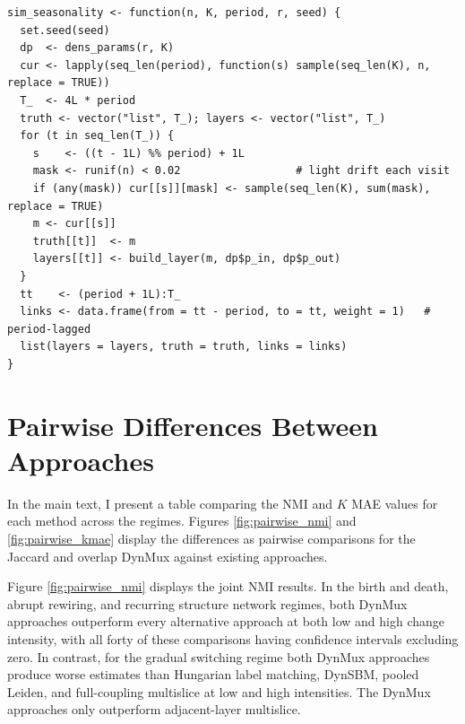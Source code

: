 \documentclass[11pt, letterpaper]{article}
\numberwithin{equation}{section}
\begin{document}
\begin{lstlisting}[caption={Recurring structure generator. Interlayer links
connect layer $t$ to layer $t-\text{period}$ rather than to layer $t-1$.},
                   label={lst:seasonality}]
sim_seasonality <- function(n, K, period, r, seed) {
  set.seed(seed)
  dp  <- dens_params(r, K)
  cur <- lapply(seq_len(period), function(s) sample(seq_len(K), n, replace = TRUE))
  T_  <- 4L * period
  truth <- vector("list", T_); layers <- vector("list", T_)
  for (t in seq_len(T_)) {
    s    <- ((t - 1L) %% period) + 1L
    mask <- runif(n) < 0.02                  # light drift each visit
    if (any(mask)) cur[[s]][mask] <- sample(seq_len(K), sum(mask), replace = TRUE)
    m <- cur[[s]]
    truth[[t]]  <- m
    layers[[t]] <- build_layer(m, dp$p_in, dp$p_out)
  }
  tt    <- (period + 1L):T_
  links <- data.frame(from = tt - period, to = tt, weight = 1)   # period-lagged
  list(layers = layers, truth = truth, links = links)
}
\end{lstlisting}


\section{Pairwise Differences Between Approaches}
\label{app:paired}
In the main text, I present a table comparing the NMI and $K$ MAE values for each method across the regimes. Figures \ref{fig:pairwise_nmi} and \ref{fig:pairwise_kmae} display the differences as pairwise comparisons for the Jaccard and overlap DynMux against existing approaches. 

Figure \ref{fig:pairwise_nmi} displays the joint NMI results. In the birth and death, abrupt rewiring, and recurring structure network regimes, both DynMux approaches outperform every alternative approach at both low and high change intensity, with all forty of these comparisons having confidence intervals excluding zero. In contrast, for the gradual switching regime both DynMux approaches produce worse estimates than Hungarian label matching, DynSBM, pooled Leiden, and full-coupling multislice at low and high intensities. The DynMux approaches only outperform adjacent-layer multislice.
\end{document}
